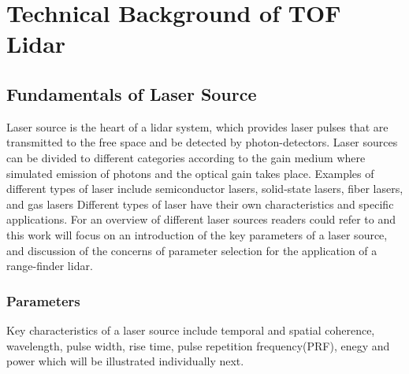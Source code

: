 \chapter{Technical Background of TOF Lidar}
\section{Fundamentals of Laser Source}


Laser source is the heart of a lidar system, which provides laser pulses that are transmitted to the free space and be detected by photon-detectors. Laser sources can be divided to different categories according to the gain medium where simulated emission of photons and the optical gain takes place. Examples of different types of laser include semiconductor lasers, solid-state lasers, fiber lasers, and gas lasers \etc Different types of laser have their own characteristics and specific applications. For an overview of different laser sources readers could refer to  and this work will focus on an introduction of the key parameters of a laser source, and discussion of the concerns of parameter selection for the application of a range-finder lidar. 
\subsection{Parameters}
Key characteristics of a laser source include temporal and spatial coherence, wavelength, pulse width, rise time, pulse repetition frequency(PRF), enegy and power \etc which will be illustrated individually next.
